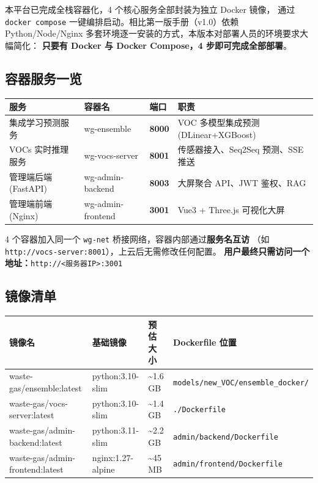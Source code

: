 \documentclass[UTF8,a4paper,11pt]{ctexart}
\begin{document}
本平台已完成全栈容器化，4 个核心服务全部封装为独立 Docker 镜像，
通过 \texttt{docker compose} 一键编排启动。相比第一版手册（v1.0）依赖
Python/Node/Nginx 多套环境逐一安装的方式，本版本对部署人员的环境要求大幅简化：
\textbf{只要有 Docker 与 Docker Compose，4 步即可完成全部部署}。

\subsection{容器服务一览}

\begin{longtable}{L{3.6cm} L{3.0cm} L{1.6cm} L{6.0cm}}
\toprule
\textbf{服务} & \textbf{容器名} & \textbf{端口} & \textbf{职责} \\
\midrule
\endhead
集成学习预测服务      & wg-ensemble        & \textbf{8000} & VOC 多模型集成预测 (DLinear+XGBoost) \\
VOCs 实时推理服务     & wg-vocs-server     & \textbf{8001} & 传感器接入、Seq2Seq 预测、SSE 推送 \\
管理端后端 (FastAPI)  & wg-admin-backend   & \textbf{8003} & 大屏聚合 API、JWT 鉴权、RAG \\
管理端前端 (Nginx)    & wg-admin-frontend  & \textbf{3001} & Vue3 + Three.js 可视化大屏 \\
\bottomrule
\end{longtable}

\begin{successbox}[最终入口]
4 个容器加入同一个 \texttt{wg-net} 桥接网络，容器内部通过\textbf{服务名互访}
（如 \texttt{http://vocs-server:8001}），上云后无需修改任何配置。
\textbf{用户最终只需访问一个地址：}\texttt{http://<服务器IP>:3001}
\end{successbox}

\subsection{镜像清单}

\begin{longtable}{L{4.5cm} L{2.5cm} L{2.5cm} L{4.0cm}}
\toprule
\textbf{镜像名} & \textbf{基础镜像} & \textbf{预估大小} & \textbf{Dockerfile 位置} \\
\midrule
\endhead
waste-gas/ensemble:latest        & python:3.10-slim    & \textasciitilde{}1.6 GB & \texttt{models/new\_VOC/ensemble\_docker/} \\
waste-gas/vocs-server:latest     & python:3.10-slim    & \textasciitilde{}1.4 GB & \texttt{./Dockerfile} \\
waste-gas/admin-backend:latest   & python:3.11-slim    & \textasciitilde{}2.2 GB & \texttt{admin/backend/Dockerfile} \\
waste-gas/admin-frontend:latest  & nginx:1.27-alpine   & \textasciitilde{}45  MB & \texttt{admin/frontend/Dockerfile} \\
\bottomrule
\end{longtable}
\end{document}
